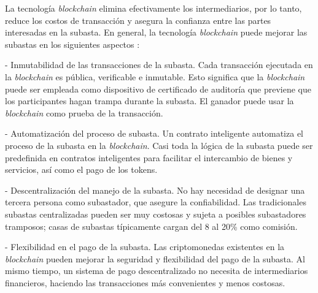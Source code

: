 
  La tecnología \textit{blockchain} elimina efectivamente los intermediarios, por lo tanto, reduce los costos de 
  transacción y asegura la confianza entre las partes interesadas en la subasta. En general, la tecnología
  \textit{blockchain} puede mejorar las subastas en los siguientes aspectos \parencite{shi2021}:
  
  - Inmutabilidad de las transacciones de la subasta. Cada transacción ejecutada en la \textit{blockchain} es pública, verificable e inmutable.
  Esto significa que la \textit{blockchain} puede ser empleada como dispositivo de certificado de auditoría que previene que los participantes
  hagan trampa durante la subasta. El ganador puede usar la \textit{blockchain} como prueba de la transacción.
  
  - Automatización del proceso de subasta. Un contrato inteligente automatiza el proceso de la subasta en la \textit{blockchain}. Casi toda 
  la lógica de la subasta puede ser predefinida en contratos inteligentes para facilitar el intercambio de bienes y servicios, así como
  el pago de los tokens.

  - Descentralización del manejo de la subasta. No hay necesidad de designar una tercera persona como subastador, que asegure la 
  confiabilidad. Las tradicionales subastas centralizadas pueden ser muy costosas y sujeta a posibles subastadores tramposos; casas
  de subastas típicamente cargan del 8 al 20\% como comisión. 

  - Flexibilidad en el pago de la subasta. Las criptomonedas existentes en la \textit{blockchain} pueden mejorar la seguridad y 
  flexibilidad del pago de la subasta. Al mismo tiempo, un sistema de pago descentralizado no necesita de intermediarios 
  financieros, haciendo
  las transacciones más convenientes y menos costosas. %

